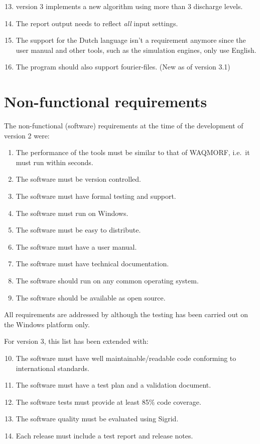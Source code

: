 \begin{enumerate}
\setcounter{enumi}{12} %
\item \dfastmi version 3 implements a new algorithm using more than 3 discharge levels.
\item The report output needs to reflect \emph{all} input settings.
\item The support for the Dutch language isn't a requirement anymore since the user manual and other tools, such as the simulation engines, only use English.
\item The program should also support \dflowfm fourier-files. (New as of version 3.1)
\end{enumerate}


\section{Non-functional requirements}

The non-functional (software) requirements at the time of the development of \dfastmi version 2 were:

\begin{enumerate}
\item The performance of the tools must be similar to that of WAQMORF, i.e.~it must run within seconds.
\item The software must be version controlled.
\item The software must have formal testing and support.
\item The software must run on Windows.
\item The software must be easy to distribute.
\item The software must have a user manual.
\item The software must have technical documentation.

\item The software should run on any common operating system.
\item The software should be available as open source.
\end{enumerate}

All requirements are addressed by \dfastmi although the testing has been carried out on the Windows platform only.

For \dfastmi version 3, this list has been extended with:

\begin{enumerate}
\setcounter{enumi}{9} %
\item The software must have well maintainable/readable code conforming to international standards.
\item The software must have a test plan and a validation document.
\item The software tests must provide at least 85\% code coverage.
\item The software quality must be evaluated using Sigrid.
\item Each release must include a test report and release notes.
\end{enumerate}

